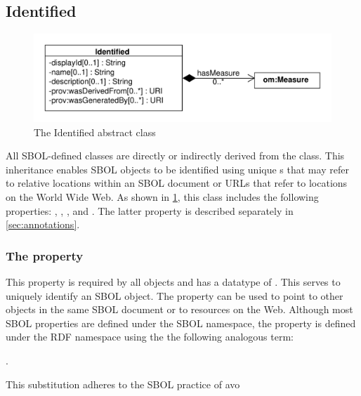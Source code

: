 \subsection {Identified}
\label{sec:Identified}

\begin{figure}[ht]
\begin{center}
\includegraphics[scale=0.6]{uml/identified}
\caption[]{The Identified abstract class}
\label{uml:identified}
\end{center}
\end{figure}

All SBOL-defined classes are directly or indirectly derived from the   class. This inheritance enables SBOL objects to be identified using unique s that may refer to relative locations within an SBOL document or URLs that refer to locations on the World Wide Web. As shown in \ref{uml:identified}, this class includes the following properties: , ,  , and . The latter property is described separately in \ref{sec:annotations}.

\subsubsection*{The  property}
\label{sec:identity}
This property is required by all  objects and has a datatype of . This  serves to uniquely identify an SBOL object. The  property can be used to point to other objects in the same SBOL document or to resources on the Web. Although most SBOL properties are defined under the SBOL namespace, the  property is defined under the RDF namespace using the the following analogous term:

.

This substitution adheres to the SBOL practice of avo


